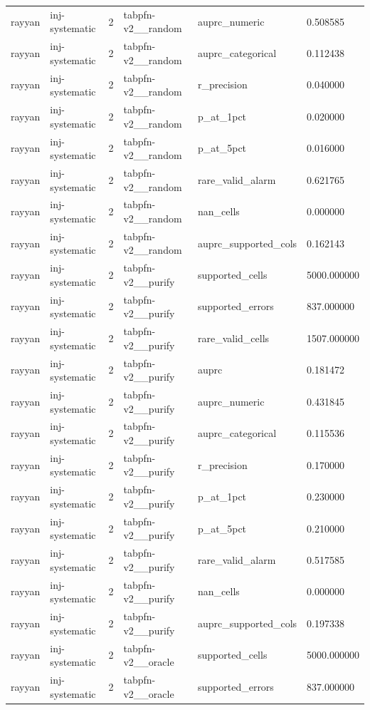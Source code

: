 \begin{tabular}{llllll}
rayyan & inj-systematic & 2 & tabpfn-v2\_\_random & auprc\_numeric & 0.508585 \\
rayyan & inj-systematic & 2 & tabpfn-v2\_\_random & auprc\_categorical & 0.112438 \\
rayyan & inj-systematic & 2 & tabpfn-v2\_\_random & r\_precision & 0.040000 \\
rayyan & inj-systematic & 2 & tabpfn-v2\_\_random & p\_at\_1pct & 0.020000 \\
rayyan & inj-systematic & 2 & tabpfn-v2\_\_random & p\_at\_5pct & 0.016000 \\
rayyan & inj-systematic & 2 & tabpfn-v2\_\_random & rare\_valid\_alarm & 0.621765 \\
rayyan & inj-systematic & 2 & tabpfn-v2\_\_random & nan\_cells & 0.000000 \\
rayyan & inj-systematic & 2 & tabpfn-v2\_\_random & auprc\_supported\_cols & 0.162143 \\
rayyan & inj-systematic & 2 & tabpfn-v2\_\_purify & supported\_cells & 5000.000000 \\
rayyan & inj-systematic & 2 & tabpfn-v2\_\_purify & supported\_errors & 837.000000 \\
rayyan & inj-systematic & 2 & tabpfn-v2\_\_purify & rare\_valid\_cells & 1507.000000 \\
rayyan & inj-systematic & 2 & tabpfn-v2\_\_purify & auprc & 0.181472 \\
rayyan & inj-systematic & 2 & tabpfn-v2\_\_purify & auprc\_numeric & 0.431845 \\
rayyan & inj-systematic & 2 & tabpfn-v2\_\_purify & auprc\_categorical & 0.115536 \\
rayyan & inj-systematic & 2 & tabpfn-v2\_\_purify & r\_precision & 0.170000 \\
rayyan & inj-systematic & 2 & tabpfn-v2\_\_purify & p\_at\_1pct & 0.230000 \\
rayyan & inj-systematic & 2 & tabpfn-v2\_\_purify & p\_at\_5pct & 0.210000 \\
rayyan & inj-systematic & 2 & tabpfn-v2\_\_purify & rare\_valid\_alarm & 0.517585 \\
rayyan & inj-systematic & 2 & tabpfn-v2\_\_purify & nan\_cells & 0.000000 \\
rayyan & inj-systematic & 2 & tabpfn-v2\_\_purify & auprc\_supported\_cols & 0.197338 \\
rayyan & inj-systematic & 2 & tabpfn-v2\_\_oracle & supported\_cells & 5000.000000 \\
rayyan & inj-systematic & 2 & tabpfn-v2\_\_oracle & supported\_errors & 837.000000 \\

\end{tabular}
